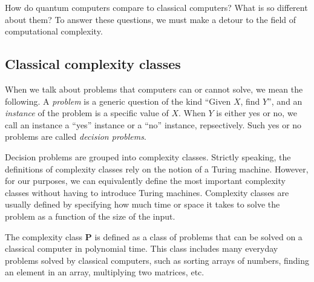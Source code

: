 
How do quantum computers compare to classical computers? What is so different about them? To answer these questions, we must make a detour to the field of computational complexity. 





\subsection{Classical complexity classes}


When we talk about problems that computers can or cannot solve, we mean the following. A \textit{problem} is a generic question of the kind ``Given $X$, find $Y$'', and an \textit{instance} of the problem is a specific value of $X$. When $Y$ is either yes or no, we call an instance a ``yes'' instance or a ``no'' instance, repsectively. Such yes or no problems are called \textit{decision problems}. 

Decision problems are grouped into complexity classes. Strictly speaking, the definitions of complexity classes rely on the notion of a Turing machine. However, for our purposes, we can equivalently define the most important complexity classes without having to introduce Turing machines. Complexity classes are usually defined by specifying how much time or space it takes to solve the problem as a function of the size of the input.

The complexity class $\mathbf{P}$ is defined as a class of problems that can be solved on a classical computer in polynomial time. This class includes many everyday problems solved by classical computers, such as sorting arrays of numbers, finding an element in an array, multiplying two matrices, etc. 

